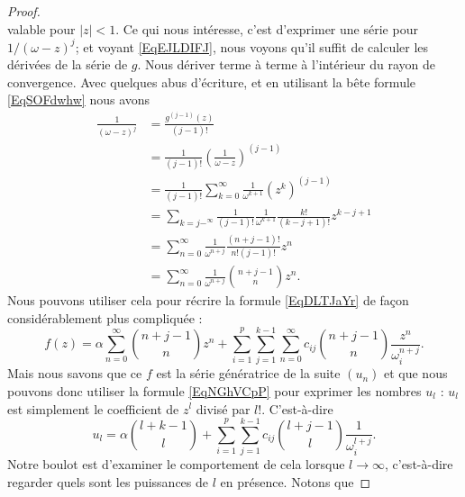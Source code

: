 \begin{proof}
\begin{equation}
    \end{equation}
    valable pour \( | z |<1\). Ce qui nous intéresse, c'est d'exprimer une série pour \( 1/(\omega-z)^j\); et voyant \eqref{EqEJLDIFJ}, nous voyons qu'il suffit de calculer les dérivées de la série de \( g\). Nous dériver terme à terme à l'intérieur du rayon de convergence. Avec quelques abus d'écriture, et en utilisant la bête formule \eqref{EqSOFdwhw} nous avons
    \begin{subequations}
        \begin{align}
            \frac{1}{ (\omega-z)^j }&=\frac{ g^{(j-1)}(z) }{ (j-1)! }\\
            &=\frac{1}{ (j-1)! }\left( \frac{1}{ \omega-z } \right)^{(j-1)}\\
            &=\frac{1}{ (j-1)! }\sum_{k=0}^{\infty}\frac{1}{ \omega^{k+1} }(z^k)^{(j-1)}\\
            &=\sum_{k=j-^{\infty}}\frac{1}{ (j-1)! }\frac{1}{ \omega^{k+1} }\frac{ k! }{ (k-j+1)! }z^{k-j+1}\\
            &=\sum_{n=0}^{\infty}\frac{1}{ \omega^{n+j} }\frac{ (n+j-1)! }{ n!(j-1)! }z^n\\
            &=\sum_{n=0}^{\infty}\frac{1}{ \omega^{n+j} }{n+j-1\choose n}z^n.
        \end{align}
    \end{subequations}
    Nous pouvons utiliser cela pour récrire la formule \eqref{EqDLTJaYr} de façon considérablement plus compliquée :
    \begin{equation}
            f(z)=\alpha\sum_{n=0}^{\infty}{n+j-1\choose n}z^n
            +\sum_{i=1}^p\sum_{j=1}^{k-1}\sum_{n=0}^{\infty}c_{ij}{n+j-1\choose n}\frac{ z^n }{ \omega_i^{n+j} }.
    \end{equation}
    Mais nous savons que ce \( f\) est la série génératrice de la suite \( (u_n)\) et que nous pouvons donc utiliser la formule \eqref{EqNGhVCpP} pour exprimer les nombres \( u_l\) : \( u_l\) est simplement le coefficient de \( z^l\) divisé par \( l!\). C'est-à-dire
    \begin{equation}
        u_l=\alpha{l+k-1\choose l}+\sum_{i=1}^p\sum_{j=1}^{k-1}c_{ij}{l+j-1\choose l}\frac{1}{ \omega_i^{l+j} }.
    \end{equation}
    Notre boulot est d'examiner le comportement de cela lorsque \( l\to\infty\), c'est-à-dire regarder quels sont les puissances de \( l\) en présence. Notons que


\end{proof}
